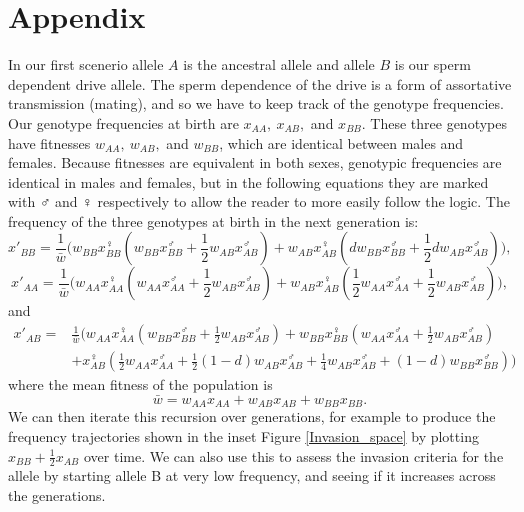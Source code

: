 \documentclass[12pt,letterpaper]{article}
\begin{document}
\section*{Appendix}
In our first scenerio allele $A$ is the ancestral allele and allele
$B$ is our sperm dependent drive allele.
The sperm dependence of the drive is a form of assortative
transmission (mating), and so we have to keep track of the genotype frequencies.
Our genotype frequencies at birth are $x_{AA},~x_{AB},$ and
$x_{BB}$. These three genotypes have fitnesses $w_{AA},~w_{AB},$ and
$w_{BB}$, which are identical between males and females. Because 
fitnesses are equivalent in both sexes, genotypic frequencies
are identical in males and females, but in the following
equations they are marked with $\Mars$ and $\Venus$ respectively to
allow the reader to more easily follow the logic. 
The frequency of the three genotypes at birth in the next generation is:
\begin{equation}
x'_{BB} =\frac{1}{\bar{w} } \Big( w_{BB} x_{BB}^{\Venus} (w_{BB} x_{BB}^{\Mars} +\frac{1}{2}
  w_{AB} x_{AB}^{\Mars} ) + w_{AB} x_{AB}^{\Venus} (d w_{BB}
  x_{BB}^{\Mars} +\frac{1}{2} d
w_{AB} x_{AB}^{\Mars} ) \Big),  \label{eqn.A1}
\end{equation}
\begin{equation}
x'_{AA} =\frac{1}{\bar{w} } \Big(  w_{AA} x_{AA}^{\Venus} (w_{AA} x_{AA}^{\Mars} + \frac{1}{2}
   w_{AB} x_{AB}^{\Mars}) + w_{AB} x_{AB}^{\Venus}(\frac{1}{2} w_{AA} x_{AA}^{\Mars}+ \frac{1}{2} 
  w_{AB} x_{AB}^{\Mars}) \Big),  \label{eqn.A2}
\end{equation}
and
\begin{eqnarray}
x'_{AB} = & \frac{1}{\bar{w} } \Big( w_{AA} x_{AA}^{\Venus}  ( w_{BB}  x_{BB}^{\Mars} + \frac{1}{2}
  w_{AB}  x_{AB}^{\Mars} ) +w_{BB} x_{BB}^{\Venus} ( w_{AA}  x_{AA}^{\Mars} + \frac{1}{2}
  w_{AB}  x_{AB}^{\Mars} )  \nonumber \\
& + x_{AB}^{\Venus}(\frac{1}{2}  w_{AA}  x_{AA}^{\Mars}+\frac{1}{2} (1-d)
 w_{AB}  x_{AB}^{\Mars} + \frac{1}{4}  w_{AB}
 x_{AB}^{\Mars} + (1-d)  w_{BB}  x_{BB}^{\Mars} ) \Big) \label{eqn.A3}
\end{eqnarray}
where the mean fitness of the population is
\begin{equation}
\bar{w} = w_{AA} x_{AA}+w_{AB}  x_{AB} +w_{BB}  x_{BB}.
\end{equation}
We can then iterate this recursion over generations, for
example to produce the frequency trajectories shown in the inset
Figure \ref{Invasion_space} by plotting $x_{BB}+ \frac{1}{2}x_{AB}$
over time. We can also use this to assess the
invasion criteria for the allele by starting allele B at very low
frequency, and seeing if it increases across the generations.
\end{document}
